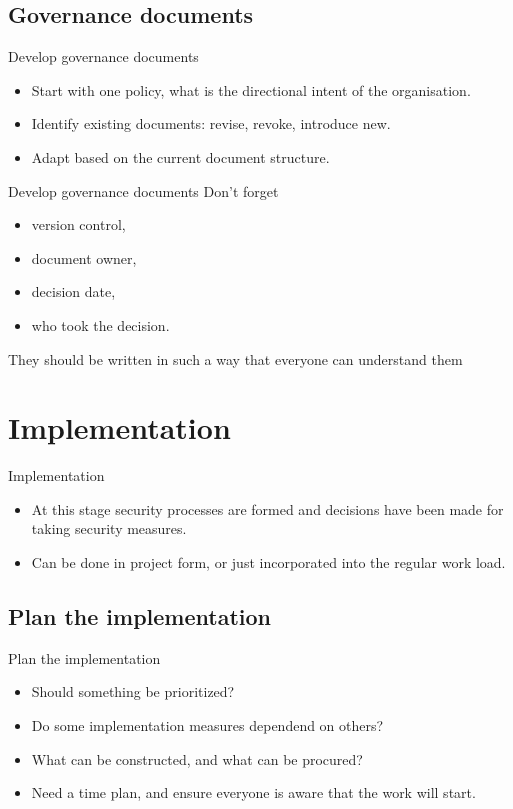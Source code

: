 \documentclass{beamer}
\begin{document}
\subsection{Governance documents}
\begin{frame}{Develop governance documents}
  \begin{itemize}
    \item Start with one policy, what is the directional intent of the organisation.
    \item Identify existing documents: revise, revoke, introduce new.
    \item Adapt based on the current document structure.
  \end{itemize}
\end{frame}
\begin{frame}{Develop governance documents}
  Don't forget
  \begin{itemize}
    \item version control,
    \item document owner,
    \item decision date,
    \item who took the decision.
  \end{itemize}
  They should be written in such a way that everyone can understand them
\end{frame}

\section{Implementation}
\begin{frame}{Implementation}
  \begin{itemize}
    \item At this stage security processes are formed and decisions have been
      made for taking security measures.
    \item Can be done in project form, or just incorporated into the regular work load.
  \end{itemize}
\end{frame}

\subsection{Plan the implementation}
\begin{frame}{Plan the implementation}
  \begin{itemize}
    \item Should something be prioritized?
    \item Do some implementation measures dependend on others?
    \item What can be constructed, and what can be procured?
    \item Need a time plan, and ensure everyone is aware that the work will
      start.
  \end{itemize}
\end{frame}
\end{document}
